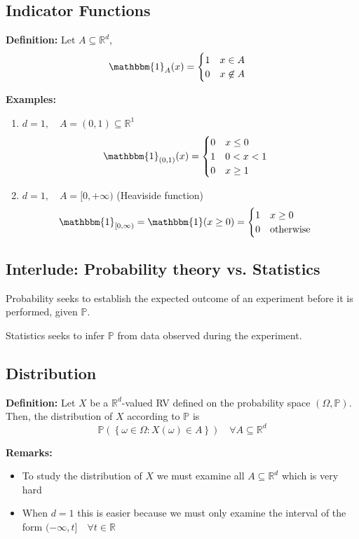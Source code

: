 \documentclass[12pt]{article}
\renewcommand{\P}{\mathbb{P}}
\newcommand{\R}{\mathbb{R}}
\newcommand{\bbm}[1]{\mathbbm{#1}}
\begin{document}
\subsection*{Indicator Functions}
\textbf{Definition:} Let $A \subseteq \R^d$, 
\[\mathbbm{1}_A(x) = \begin{cases}
    1 \quad x \in A\\
    0 \quad x \not \in A
\end{cases}\]

\textbf{Examples:}
\begin{enumerate}
    \item $d=1, \quad A = (0, 1) \subseteq \R^1$
    \[\bbm{1}_{(0, 1)}(x) = \begin{cases}
        0 \quad x \leq 0\\
        1 \quad 0 < x < 1\\
        0 \quad x \geq 1
    \end{cases} \]

    \item $d = 1, \quad A = [0, +\infty)$ (Heaviside function)
    \[\bbm{1}_{[0, \infty)} = \bbm{1}(x \geq 0) = \begin{cases}
        1 \quad x \geq 0 \\
        0 \quad \text{otherwise}
    \end{cases}\]
\end{enumerate}

\subsection*{Interlude: Probability theory vs. Statistics}
Probability seeks to establish the expected outcome of an experiment before it is performed, given $\P$.

Statistics seeks to infer $\P$ from data observed during the experiment. 

\subsection*{Distribution}
\textbf{Definition:} Let $X$ be a $\R^d$-valued RV defined on the probability space $(\Omega, \P)$. Then, the distribution of $X$ according to $\P$ is 
\[\P\left(\left\{ \omega \in \Omega: X(\omega) \in A \right\}\right) \quad \forall A \subseteq \R^d\]

\textbf{Remarks:}
\begin{itemize}
    \item To study the distribution of $X$ we must examine all $A \subseteq \R^d$ which is very hard 
    \item When $d=1$ this is easier because we must only examine the interval of the form $(-\infty, t] \quad \forall t\in \R$
\end{itemize}
\end{document}
